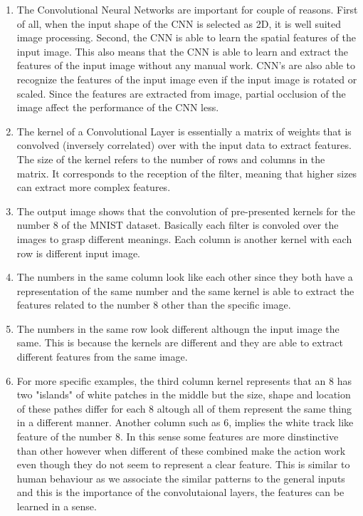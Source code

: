 \documentclass[3p,times,procedia]{elsarticle}
\begin{document}
\begin{enumerate}
    \item The Convolutional Neural Networks are important for couple of reasons.
    First of all, when the input shape of the CNN is selected as 2D, it is well suited image processing.
    Second, the CNN is able to learn the spatial features of the input image. This also means that the CNN is able to learn and extract the features of the input image without any manual work.
    CNN's are also able to recognize the features of the input image even if the input image is rotated or scaled.
    Since the features are extracted from image, partial occlusion of the image affect the performance of the CNN less.
    \item The kernel of a Convolutional Layer  is essentially a matrix of weights that is convolved (inversely correlated) over with the input data to extract features.
    The size of the kernel refers to the number of rows and columns in the matrix. It corresponds to the reception of the filter, meaning that higher sizes can extract more complex features. 
    
    \item The output image shows that the convolution of pre-presented kernels for the number 8 of the MNIST dataset. Basically each filter is convoled over the images to grasp different meanings. Each column is another kernel with each row is different input image.
    
    \item The numbers in the same column look like each other since they both have a representation of the same number and the same kernel is able to extract the features related to the number 8 other than the specific image.
    
    \item The numbers in the same row look different althougn the input image the same. This is because the kernels are different and they are able to extract different features from the same image.
    
    \item For more specific examples, the third column kernel represents that an 8 has two "islands" of white patches in the middle but the size, shape and location of these pathes differ for each 8 altough all of them represent the same thing in a different manner.
     Another column such as 6, implies the white track like feature of the number 8. In this sense some features are more dinstinctive than other however when different of these combined make the action work even though they do not seem to represent a clear feature.
     This is similar to human behaviour as we associate the similar patterns to the general inputs and this is the importance of the convolutaional layers, the features can be learned in a sense.
\end{enumerate}
\end{document}

